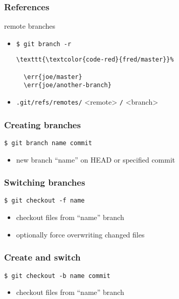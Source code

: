 \documentclass[english]{beamer}
\newcommand{\CMD}[1]{%
\texttt{\textcolor{code-blue}{#1}}%
}
\newcommand{\cmd}[1]{%
\texttt{\textcolor{code-orange}{#1}}%
}
\newcommand{\err}[1]{%
\texttt{\textcolor{code-red}{#1}}%
}
\newcommand{\fnt}[1]{%
\texttt{\textcolor{code-gray}{#1}}%
}
\newcommand{\faint}[1]{%
\textcolor{code-gray}{#1}%
}
\begin{document}
\begin{frame}[fragile]
\frametitle{References}
remote branches
\begin{itemize}
        \item \CMD{\$ git branch -r} \\
                {\small
                \begin{Verbatim}[commandchars=\\\{\}]
  \err{fred/master}
  \err{joe/master}
  \err{joe/another-branch}
                \end{Verbatim}
                }
        \item \cmd{.git/refs/remotes/}<remote>\cmd{/}<branch>
\end{itemize}
\end{frame}

\begin{frame}
\frametitle{Creating branches}

\CMD{\$ git branch name \fnt{commit}}
\begin{itemize}
        \item new branch ``name'' on HEAD \faint{or specified} commit
\end{itemize}

\end{frame}

\begin{frame}
\frametitle{Switching branches}

\CMD{\$ git checkout \fnt{-f} name}
\begin{itemize}
        \item checkout files from ``name'' branch
        \item \faint{optionally} force overwriting changed files
\end{itemize}

\end{frame}

\begin{frame}
\frametitle{Create and switch}

\CMD{\$ git checkout -b name \fnt{commit}}
\begin{itemize}
        \item checkout files from ``name'' branch
\end{itemize}

\end{frame}
\end{document}
